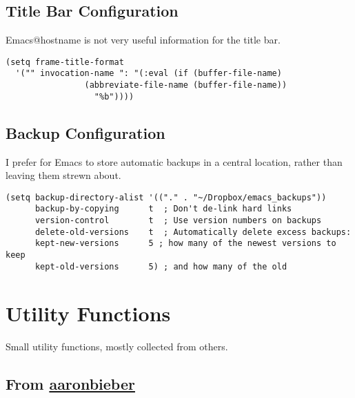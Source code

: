 \documentclass{article}
\begin{document}
\subsection{Title Bar Configuration}
\label{sec-4-2}

Emacs@hostname is not very useful information for the title bar.

\begin{verbatim}
(setq frame-title-format
  '("" invocation-name ": "(:eval (if (buffer-file-name)
                (abbreviate-file-name (buffer-file-name))
                  "%b"))))
\end{verbatim}


\subsection{Backup Configuration}
\label{sec-4-3}

I prefer for Emacs to store automatic backups in a central location, rather than leaving them strewn about.

\begin{verbatim}
(setq backup-directory-alist '(("." . "~/Dropbox/emacs_backups"))
      backup-by-copying      t  ; Don't de-link hard links
      version-control        t  ; Use version numbers on backups
      delete-old-versions    t  ; Automatically delete excess backups:
      kept-new-versions      5 ; how many of the newest versions to keep
      kept-old-versions      5) ; and how many of the old
\end{verbatim}

\section{Utility Functions}
\label{sec-5}

Small utility functions, mostly collected from others.

\subsection{From \href{https://github.com/aaronbieber}{aaronbieber}}
\label{sec-5-1}
\end{document}
